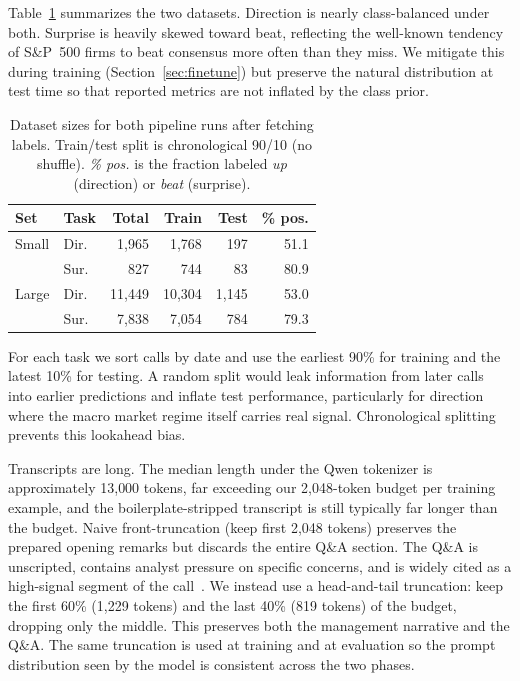 \documentclass[11pt]{article}
\begin{document}
Table~\ref{tab:dataset} summarizes the two datasets. Direction is
nearly class-balanced under both. Surprise is heavily skewed toward
beat, reflecting the well-known tendency of S\&P~500 firms to beat
consensus more often than they miss. We mitigate this during
training (Section~\ref{sec:finetune}) but preserve the natural
distribution at test time so that reported metrics are not inflated
by the class prior.

\begin{table}[t]
\centering
\small
\begin{tabular}{llrrrr}
\toprule
\textbf{Set} & \textbf{Task} & \textbf{Total} & \textbf{Train} & \textbf{Test} & \textbf{\% pos.} \\
\midrule
Small & Dir. &  1{,}965 &  1{,}768 &     197 & 51.1 \\
      & Sur.  &      827 &      744 &      83 & 80.9 \\
\midrule
Large & Dir. & 11{,}449 & 10{,}304 & 1{,}145 & 53.0 \\
      & Sur.  &  7{,}838 &  7{,}054 &     784 & 79.3 \\
\bottomrule
\end{tabular}
\caption{Dataset sizes for both pipeline runs after fetching labels.
Train/test split is chronological 90/10 (no shuffle). \emph{\% pos.}
is the fraction labeled \emph{up} (direction) or \emph{beat}
(surprise).}
\label{tab:dataset}
\end{table}

For each task we sort calls by date and use the earliest 90\% for
training and the latest 10\% for testing. A random split would leak
information from later calls into earlier predictions and inflate
test performance, particularly for direction where the macro market
regime itself carries real signal. Chronological splitting prevents
this lookahead bias.

Transcripts are long. The median length under the Qwen tokenizer is
approximately 13{,}000 tokens, far exceeding our 2{,}048-token
budget per training example, and the boilerplate-stripped transcript
is still typically far longer than the budget. Naive front-truncation
(keep first 2{,}048 tokens) preserves the prepared opening remarks
but discards the entire Q\&A section. The Q\&A is unscripted,
contains analyst pressure on specific concerns, and is widely cited
as a high-signal segment of the
call~\citep{Qin2019,LarckerZakolyukina2012}. We
instead use a head-and-tail truncation: keep the first 60\%
(1{,}229 tokens) and the last 40\% (819 tokens) of the budget,
dropping only the middle. This preserves both the management
narrative and the Q\&A. The same truncation is used at training and
at evaluation so the prompt distribution seen by the model is
consistent across the two phases.
\end{document}
